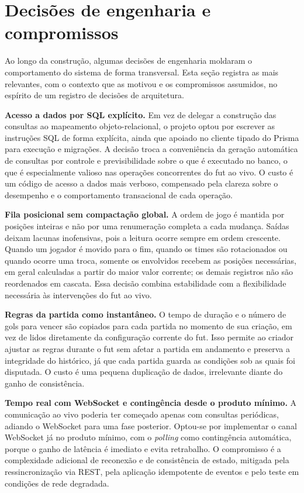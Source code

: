 \section{Decisões de engenharia e compromissos}
  \label{sec:dev-decisoes}

    Ao longo da construção, algumas decisões de engenharia moldaram o comportamento do sistema de forma transversal. Esta seção registra as mais relevantes, com o contexto que as motivou e os compromissos assumidos, no espírito de um registro de decisões de arquitetura.

    \textbf{Acesso a dados por SQL explícito.} Em vez de delegar a construção das consultas ao mapeamento objeto-relacional, o projeto optou por escrever as instruções SQL de forma explícita, ainda que apoiado no cliente tipado do Prisma para execução e migrações. A decisão troca a conveniência da geração automática de consultas por controle e previsibilidade sobre o que é executado no banco, o que é especialmente valioso nas operações concorrentes do fut ao vivo. O custo é um código de acesso a dados mais verboso, compensado pela clareza sobre o desempenho e o comportamento transacional de cada operação.

    \textbf{Fila posicional sem compactação global.} A ordem de jogo é mantida por posições inteiras e não por uma renumeração completa a cada mudança. Saídas deixam lacunas inofensivas, pois a leitura ocorre sempre em ordem crescente. Quando um jogador é movido para o fim, quando os times são rotacionados ou quando ocorre uma troca, somente os envolvidos recebem as posições necessárias, em geral calculadas a partir do maior valor corrente; os demais registros não são reordenados em cascata. Essa decisão combina estabilidade com a flexibilidade necessária às intervenções do fut ao vivo.

    \textbf{Regras da partida como instantâneo.} O tempo de duração e o número de gols para vencer são copiados para cada partida no momento de sua criação, em vez de lidos diretamente da configuração corrente do fut. Isso permite ao criador ajustar as regras durante o fut sem afetar a partida em andamento e preserva a integridade do histórico, já que cada partida guarda as condições sob as quais foi disputada. O custo é uma pequena duplicação de dados, irrelevante diante do ganho de consistência.

    \textbf{Tempo real com WebSocket e contingência desde o produto mínimo.} A comunicação ao vivo poderia ter começado apenas com consultas periódicas, adiando o WebSocket para uma fase posterior. Optou-se por implementar o canal WebSocket já no produto mínimo, com o \textit{polling} como contingência automática, porque o ganho de latência é imediato e evita retrabalho. O compromisso é a complexidade adicional de reconexão e de consistência de estado, mitigada pela ressincronização via REST, pela aplicação idempotente de eventos e pelo teste em condições de rede degradada.

